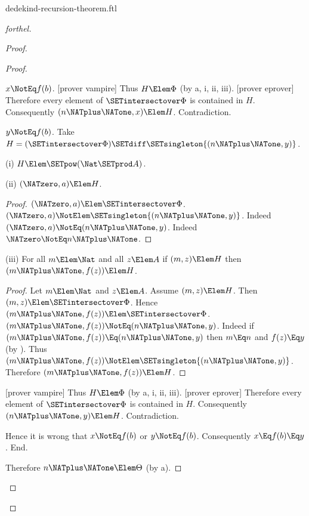 \documentclass{stex}
\begin{document}
\begin{smodule}{dedekind-recursion-theorem.ftl}
\begin{proof}[forthel]
\begin{proof}
\begin{proof}
\begin{case}{$x \NotEq f(b)$.}
          [prover vampire]
          Thus $H \Elem \Phi$ (by a, i, ii, iii).
          [prover eprover]
          Therefore every element of $\SETintersectover \Phi$ is contained in $H$.
          Consequently $(n \NATplus \NATone,x) \Elem H$.
          Contradiction.
        \end{case}

        \begin{case}{$y \NotEq f(b)$.}
          Take $H = (\SETintersectover \Phi) \SETdiff \SETsingleton{(n \NATplus \NATone,y)}$.

          (i) $H \Elem \SETpow(\Nat \SETprod A)$.

          (ii) $(\NATzero,a) \Elem H$.
          \begin{proof}
            $(\NATzero,a) \Elem \SETintersectover \Phi$.
            $(\NATzero,a) \NotElem \SETsingleton{(n \NATplus \NATone,y)}$.
            Indeed $(\NATzero,a) \NotEq (n \NATplus \NATone,y)$.
            Indeed $\NATzero \NotEq n \NATplus \NATone$.
          \end{proof}

          (iii) For all $m \Elem \Nat$ and all $z \Elem A$ if $(m,z) \Elem H$ then $(m \NATplus \NATone,f(z)) \Elem H$.
          \begin{proof}
            Let $m \Elem \Nat$ and $z \Elem A$.
            Assume $(m,z) \Elem H$.
            Then $(m,z) \Elem \SETintersectover \Phi$.
            Hence $(m \NATplus \NATone,f(z)) \Elem \SETintersectover \Phi$.
            $(m \NATplus \NATone,f(z)) \NotEq (n \NATplus \NATone,y)$.
            Indeed if $(m \NATplus \NATone,f(z)) \Eq (n \NATplus \NATone,y)$ then $m \Eq n$ and $f(z) \Eq y$ (by ).
            Thus $(m \NATplus \NATone,f(z)) \NotElem \SETsingleton{(n \NATplus \NATone,y)}$.
            Therefore $(m \NATplus \NATone,f(z)) \Elem H$.
          \end{proof}

          [prover vampire]
          Thus $H \Elem \Phi$ (by a, i, ii, iii).
          [prover eprover]
          Therefore every element of $\SETintersectover \Phi$ is contained in $H$.
          Consequently $(n \NATplus \NATone,y) \Elem H$.
          Contradiction.
        \end{case}

        Hence it is wrong that $x \NotEq f(b)$ or $y \NotEq f(b)$.
        Consequently $x \Eq f(b) \Eq y$.
      End.

      Therefore $n \NATplus \NATone \Elem \Theta$ (by a).
    \end{proof}


\end{proof}
\end{proof}
\end{smodule}
\end{document}
